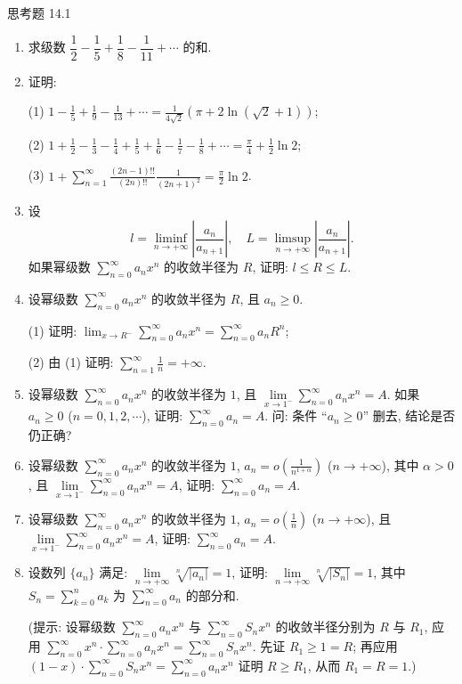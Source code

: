 \begin{exblock}{思考题 14.1}
\begin{enumerate}
  \item 求级数 $\dfrac{1}{2}-\dfrac{1}{5}+\dfrac{1}{8}-\dfrac{1}{11}+\cdots$ 的和.
  \item 证明:

  (1) $\displaystyle1-\frac{1}{5}+\frac{1}{9}-\frac{1}{13}+\cdots=\frac{1}{4\sqrt{2}}(\pi+2\ln(\sqrt{2}+1))$;

  (2) $\displaystyle1+\frac{1}{2}-\frac{1}{3}-\frac{1}{4}+\frac{1}{5}+\frac{1}{6}-\frac{1}{7}-\frac{1}{8}+\cdots=\frac{\pi}{4}+\frac{1}{2}\ln2$;

  (3) $\displaystyle1+\sum_{n=1}^{\infty}\frac{(2n-1)!!}{(2n)!!}\frac{1}{(2n+1)^{2}}=\frac{\pi}{2}\ln2$.
  \item 设
  \[
    l=\liminf_{n\to+\infty}\left|\frac{a_{n}}{a_{n+1}}\right|,\quad L=\limsup_{n\to+\infty}\left|\frac{a_{n}}{a_{n+1}}\right|.
\]
  如果幂级数 $\sum_{n=0}^{\infty}a_{n}x^{n}$ 的收敛半径为 $R$, 证明: $l\leqslant R\leqslant L$.
  \item 设幂级数 $\sum_{n=0}^{\infty}a_{n}x^{n}$ 的收敛半径为 $R$, 且 $a_{n}\geqslant0$.

  (1) 证明: $\displaystyle\lim_{x\to R^{-}}\sum_{n=0}^{\infty}a_{n}x^{n}=\sum_{n=0}^{\infty}a_{n}R^{n}$;

  (2) 由 (1) 证明: $\displaystyle\sum_{n=1}^{\infty}\frac{1}{n}=+\infty$.
  \item 设幂级数 $\sum_{n=0}^{\infty}a_{n}x^{n}$ 的收敛半径为 $1$, 且 $\lim\limits_{x\to1^{-}}\sum_{n=0}^{\infty}a_{n}x^{n}=A$. 如果 $a_{n}\geqslant0$ ($n=0,1,2,\cdots$), 证明: $\sum_{n=0}^{\infty}a_{n}=A$. 问: 条件 ``$a_{n}\geqslant0$'' 删去, 结论是否仍正确?
  \item 设幂级数 $\sum_{n=0}^{\infty}a_{n}x^{n}$ 的收敛半径为 $1$, $a_{n}=o\left(\frac{1}{n^{1+\alpha}}\right)$ ($n\to+\infty$), 其中 $\alpha>0$, 且 $\lim\limits_{x\to1^{-}}\sum_{n=0}^{\infty}a_{n}x^{n}=A$, 证明: $\sum_{n=0}^{\infty}a_{n}=A$.
  \item 设幂级数 $\sum_{n=0}^{\infty}a_{n}x^{n}$ 的收敛半径为 $1$, $a_{n}=o\left(\frac{1}{n}\right)$ ($n\to+\infty$), 且 $\lim\limits_{x\to1^{-}}\sum_{n=0}^{\infty}a_{n}x^{n}=A$, 证明: $\sum_{n=0}^{\infty}a_{n}=A$.
  \item 设数列 $\{a_{n}\}$ 满足: $\lim\limits_{n\to+\infty}\sqrt[n]{|a_{n}|}=1$, 证明: $\lim\limits_{n\to+\infty}\sqrt[n]{|S_{n}|}=1$, 其中 $S_{n}=\sum_{k=0}^{n}a_{k}$ 为 $\sum_{n=0}^{\infty}a_{n}$ 的部分和.

  (提示: 设幂级数 $\sum_{n=0}^{\infty}a_{n}x^{n}$ 与 $\sum_{n=0}^{\infty}S_{n}x^{n}$ 的收敛半径分别为 $R$ 与 $R_{1}$, 应用 $\sum_{n=0}^{\infty}x^{n}\cdot\sum_{n=0}^{\infty}a_{n}x^{n}=\sum_{n=0}^{\infty}S_{n}x^{n}$. 先证 $R_{1}\geqslant1=R$; 再应用 $(1-x)\cdot\sum_{n=0}^{\infty}S_{n}x^{n}=\sum_{n=0}^{\infty}a_{n}x^{n}$ 证明 $R\geqslant R_{1}$, 从而 $R_{1}=R=1$.)
\end{enumerate}
\end{exblock}
